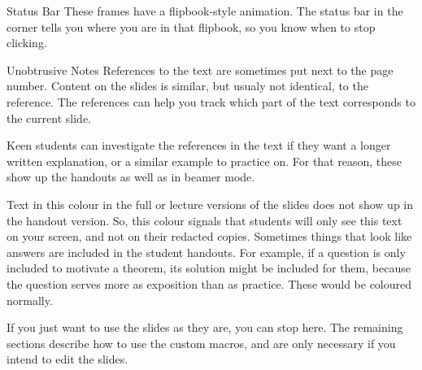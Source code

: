 \documentclass[10pt]{beamer}
\begin{document}
\begin{frame}{Status Bar}
These frames have a  flipbook-style animation. The status bar in the corner tells you where you are in that flipbook, so you know when to stop clicking.

\begin{center}
\end{center}
\end{frame}
\begin{frame}{Unobtrusive Notes}
References to the text are sometimes put next to the page number. 
Content on the slides is similar, but usualy not identical, to the reference. The references can help you track which part of the text corresponds to the current slide.
\vfill

Keen students can investigate the references in the text if they want a longer written explanation, or a similar example to practice on. For that reason, these show up the handouts as well as in beamer mode. 
\end{frame}
\begin{frame}
\textcolor{spoilercolor}{Text in this colour in the full or lecture versions of the slides does not show up in the handout version. So, this colour signals that students will only see this text on your screen, and not on their redacted copies.}
\vfill
Sometimes things that look like answers are included in the student handouts. For example, if a question is only included to motivate a theorem, its solution might be included for them, because the question serves more as exposition than as practice. These would be coloured normally.
\end{frame}
\begin{frame}
If you just want to use the slides as they are, you can stop here. 
\vfill
The remaining sections describe how to use the custom macros, and are only necessary if you intend to \alert{edit} the slides.
\end{frame}
\end{document}
